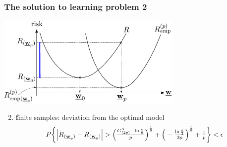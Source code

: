  


\begin{frame}\frametitle{The solution to learning problem 2} 
	\begin{center}
		\includegraphics[width=9cm]{img/section2_fig1_question1}
	\end{center}
	\begin{enumerate}\setcounter{enumi}{1}
		\item {\textbf finite samples:} deviation from the optimal model
			\vspace{-2mm}
			\begin{equation}
				P\bigg\{ {%
				\Big| R_{(\vec w_p)} - R_{(\vec w_0)} \Big| }
					> \Big(\smallfrac{G^\Lambda_{(2p)} 
						- \ln \frac{\epsilon}{8}}{p} \Big)^\frac{1}{2}
					+ \Big(-\smallfrac{\ln \frac{\epsilon}{2}}{2p} 
						\Big)^\frac{1}{2} + \smallfrac{1}{p}
				\bigg\} < \epsilon
					\label{eq:boundgenerlizationdeviation}
			\end{equation}
			\vspace{-4mm}
	\end{enumerate}
\end{frame}

